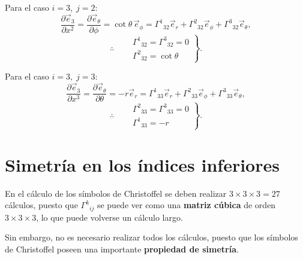 \documentclass[../apunte_mecanica_clasica.tex]{subfiles}%
\begin{document}
\begin{apuntebloque}{}
Para el caso $i=3, \; j=2$:
\begin{equation*}
    \frac{\partial \vec{e}_3}{\partial x^2} =\frac{\partial \vec{e}_\theta}{\partial \phi} = \cot\theta \, \vec{e}_\phi=\Gamma^1{}_{32}\vec{e}_r+\Gamma^2{}_{32}\vec{e}_\phi+\Gamma^3{}_{32}\vec{e}_\theta,
\end{equation*}
\begin{equation*}
    \therefore \quad 
    \left.
    \begin{aligned}
        &\Gamma^1{}_{32} =\Gamma^3{}_{32} = 0 \\
        &\Gamma^2{}_{32} = \cot\theta
    \end{aligned}
    \right\}.
\end{equation*}

Para el caso $i=3, \; j=3$:
\begin{equation*}
    \frac{\partial \vec{e}_3}{\partial x^3} =\frac{\partial \vec{e}_\theta}{\partial \theta} = -r \vec{e}_r=\Gamma^1{}_{33}\vec{e}_r+\Gamma^2{}_{33}\vec{e}_\phi+\Gamma^3{}_{33}\vec{e}_\theta,
\end{equation*}
\begin{equation*}
    \therefore \quad 
    \left.
    \begin{aligned}
        &\Gamma^2{}_{33} =\Gamma^3{}_{33} = 0 \\
        &\Gamma^1{}_{33} = -r
    \end{aligned}
    \right\}.
\end{equation*}

\end{apuntebloque}


\section{Simetría en los índices inferiores}

En el cálculo de los símbolos de Christoffel se deben realizar 
$3 \times 3 \times 3 = 27$ cálculos, puesto que 
$\Gamma^k{}_{ij}$ se puede ver como una \textbf{matriz cúbica} 
de orden $3 \times 3 \times 3$, lo que puede volverse un cálculo largo.  

Sin embargo, no es necesario realizar todos los cálculos, 
puesto que los símbolos de Christoffel poseen una importante 
\textbf{propiedad de simetría}.
\end{document}
